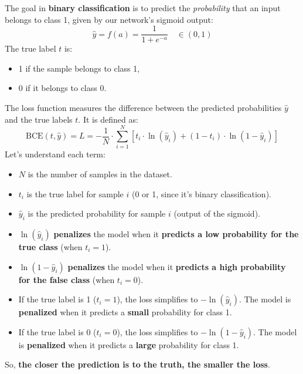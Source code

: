 \highspace
\begin{deepeningbox}
    The goal in \textbf{binary classification} is to predict the \emph{probability} that an input belongs to class 1, given by our network's sigmoid output:
    \begin{equation*}
        \hat{y} = f(a) = \dfrac{1}{1 + e^{-a}} \quad \in (0, 1)
    \end{equation*}
    The true label $t$ is:
    \begin{itemize}
        \item 1 if the sample belongs to class 1,
        \item 0 if it belongs to class 0.
    \end{itemize}
    The  loss function measures the difference between the predicted probabilities $\hat{y}$ and the true labels $t$. It is defined as:
    \begin{equation}\label{eq:bce-loss}
        \text{BCE}\left(t, \hat{y}\right) = L = - \dfrac{1}{N} \cdot \displaystyle\sum_{i=1}^{N} \left[
            t_i \cdot \ln\left(\hat{y}_i\right) + \left(1 - t_i\right) \cdot \ln\left(1 - \hat{y}_i\right)
        \right]
    \end{equation}
    Let's understand each term:
    \begin{itemize}
        \item $N$ is the number of samples in the dataset.
        \item $t_i$ is the true label for sample $i$ (0 or 1, since it's binary classification).
        \item $\hat{y}_i$ is the predicted probability for sample $i$ (output of the sigmoid).
        \item $\ln\left(\hat{y}_i\right)$ \textbf{penalizes} the model when it \textbf{predicts a low probability for the true class} (when $t_i = 1$).
        \item $\ln\left(1 - \hat{y}_i\right)$ \textbf{penalizes} the model when it \textbf{predicts a high probability for the false class} (when $t_i = 0$).
        \item If the true label is 1 ($t_i = 1$), the loss simplifies to $- \ln\left(\hat{y}_i\right)$. The model is \textbf{penalized} when it predicts a \textbf{small} probability for class 1.
        \item If the true label is 0 ($t_i = 0$), the loss simplifies to $- \ln\left(1 - \hat{y}_i\right)$. The model is \textbf{penalized} when it predicts a \textbf{large} probability for class 1.
    \end{itemize}
    So, \textbf{the closer the prediction is to the truth, the smaller the loss}.


\end{deepeningbox}
